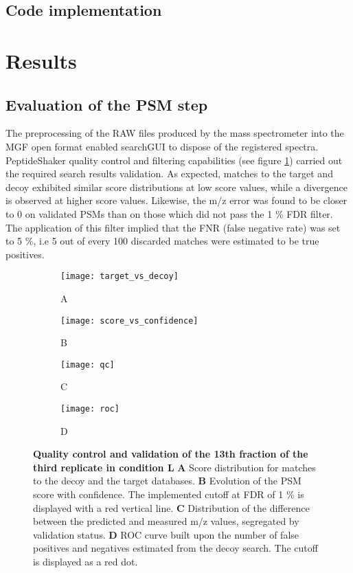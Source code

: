 \subsection{Code implementation}

\section{Results}

\subsection{Evaluation of the PSM step}

The preprocessing of the RAW files produced by the mass spectrometer into the MGF open format enabled searchGUI to dispose of the registered spectra. PeptideShaker quality control and filtering capabilities (see figure \ref{figure:qc_validation}) carried out the required search results validation. As expected, matches to the target and decoy exhibited similar score distributions at low score values, while a divergence is observed at higher score values. Likewise, the m/z error was found to be closer to 0 on validated PSMs than on those which did not pass the 1 \% FDR filter. The application of this filter implied that the FNR (false negative rate) was set to 5 \%, i.e 5 out of every 100 discarded matches were estimated to be true positives.



\begin{figure}[!h]
\centering
\begin{subfigure}{.45\textwidth}
  \centering
  \caption*{A}
  \texttt{[image: target\_vs\_decoy]}
\end{subfigure}
\begin{subfigure}{.45\textwidth}
  \centering
    \caption*{B}
  \texttt{[image: score\_vs\_confidence]}
\end{subfigure}
\bigskip

\begin{subfigure}{.45\textwidth}
  \centering
    \caption*{C}
  \texttt{[image: qc]}
\end{subfigure}
\begin{subfigure}{.45\textwidth}
  \centering
    \caption*{D}
  \texttt{[image: roc]}
\end{subfigure}
\caption[]{\textbf{Quality control and validation of the 13th fraction of the third replicate in condition L} \textbf{A} Score distribution for matches to the decoy and the target databases. \textbf{B} Evolution of the PSM score with confidence. The implemented cutoff at FDR of 1 \% is displayed with a red vertical line. \textbf{C} Distribution of the difference between the predicted and measured \ac{m/z} values, segregated by validation status. \textbf{D} ROC curve built upon the number of false positives and negatives estimated from the decoy search. The cutoff is displayed as a red dot.}
\label{figure:qc_validation}
\end{figure}

